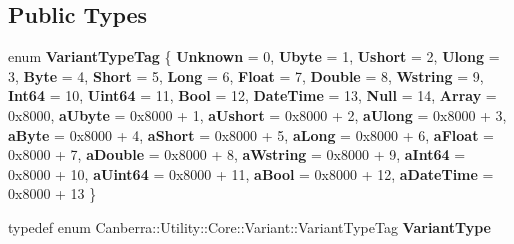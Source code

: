 \subsection*{Public Types}
\begin{DoxyCompactItemize}
\item 
\mbox{\label{class_canberra_1_1_utility_1_1_core_1_1_variant_aff423dabe071f284830608ca44fd7480}} 
enum {\bfseries Variant\+Type\+Tag} \{ \newline
{\bfseries Unknown} = 0, 
{\bfseries Ubyte} = 1, 
{\bfseries Ushort} = 2, 
{\bfseries Ulong} = 3, 
\newline
{\bfseries Byte} = 4, 
{\bfseries Short} = 5, 
{\bfseries Long} = 6, 
{\bfseries Float} = 7, 
\newline
{\bfseries Double} = 8, 
{\bfseries Wstring} = 9, 
{\bfseries Int64} = 10, 
{\bfseries Uint64} = 11, 
\newline
{\bfseries Bool} = 12, 
{\bfseries Date\+Time} = 13, 
{\bfseries Null} = 14, 
{\bfseries Array} = 0x8000, 
\newline
{\bfseries a\+Ubyte} = 0x8000 + 1, 
{\bfseries a\+Ushort} = 0x8000 + 2, 
{\bfseries a\+Ulong} = 0x8000 + 3, 
{\bfseries a\+Byte} = 0x8000 + 4, 
\newline
{\bfseries a\+Short} = 0x8000 + 5, 
{\bfseries a\+Long} = 0x8000 + 6, 
{\bfseries a\+Float} = 0x8000 + 7, 
{\bfseries a\+Double} = 0x8000 + 8, 
\newline
{\bfseries a\+Wstring} = 0x8000 + 9, 
{\bfseries a\+Int64} = 0x8000 + 10, 
{\bfseries a\+Uint64} = 0x8000 + 11, 
{\bfseries a\+Bool} = 0x8000 + 12, 
\newline
{\bfseries a\+Date\+Time} = 0x8000 + 13
 \}
\item 
\mbox{\label{class_canberra_1_1_utility_1_1_core_1_1_variant_a7f5bbdc7dd8eca265e9142643f992fd4}} 
typedef enum Canberra\+::\+Utility\+::\+Core\+::\+Variant\+::\+Variant\+Type\+Tag {\bfseries Variant\+Type}
\end{DoxyCompactItemize}
